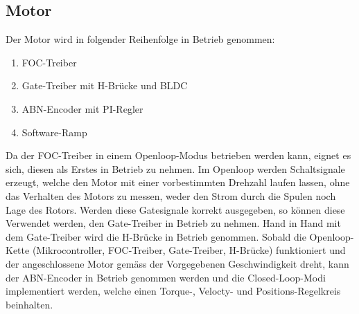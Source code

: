 \newpage
\subsection{Motor}
\label{subsec:Inbetriebnahme_Motor}

Der Motor wird in folgender Reihenfolge in Betrieb genommen:

\begin{enumerate}
\item FOC-Treiber
\item Gate-Treiber mit H-Brücke und BLDC
\item ABN-Encoder mit PI-Regler
\item Software-Ramp
\end{enumerate}

Da der FOC-Treiber in einem Openloop-Modus betrieben werden kann, eignet es sich, diesen als Erstes in Betrieb zu nehmen. Im Openloop werden Schaltsignale erzeugt, welche den Motor mit einer vorbestimmten Drehzahl laufen lassen, ohne das Verhalten des Motors zu messen, weder den Strom durch die Spulen noch Lage des Rotors. Werden diese Gatesignale korrekt ausgegeben, so können diese Verwendet werden, den Gate-Treiber in Betrieb zu nehmen. Hand in Hand mit dem Gate-Treiber wird die H-Brücke in Betrieb genommen. Sobald die Openloop-Kette (Mikrocontroller, FOC-Treiber, Gate-Treiber, H-Brücke) funktioniert und der angeschlossene Motor gemäss der Vorgegebenen Geschwindigkeit dreht, kann der ABN-Encoder in Betrieb genommen werden und die Closed-Loop-Modi implementiert werden, welche einen Torque-, Velocty- und Positions-Regelkreis beinhalten.
